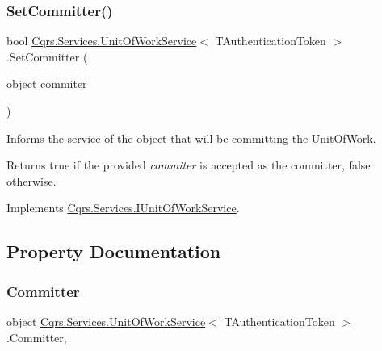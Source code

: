 \subsubsection{\texorpdfstring{Set\+Committer()}{SetCommitter()}}
{\footnotesize\ttfamily bool \hyperlink{classCqrs_1_1Services_1_1UnitOfWorkService}{Cqrs.\+Services.\+Unit\+Of\+Work\+Service}$<$ T\+Authentication\+Token $>$.Set\+Committer (\begin{DoxyParamCaption}\item[{object}]{commiter }\end{DoxyParamCaption})}



Informs the service of the object that will be committing the \hyperlink{classCqrs_1_1Services_1_1UnitOfWorkService_a1ba76512e37e5006c2b65d071803e99f_a1ba76512e37e5006c2b65d071803e99f}{Unit\+Of\+Work}. 

\begin{DoxyReturn}{Returns}
true if the provided {\itshape commiter}  is accepted as the committer, false otherwise. 
\end{DoxyReturn}


Implements \hyperlink{interfaceCqrs_1_1Services_1_1IUnitOfWorkService_a54f241cd90bbebf9cc73d5a296ed593b_a54f241cd90bbebf9cc73d5a296ed593b}{Cqrs.\+Services.\+I\+Unit\+Of\+Work\+Service}.



\subsection{Property Documentation}
\mbox{\label{classCqrs_1_1Services_1_1UnitOfWorkService_aabeccb6ba949fe02b8676b324f85950b_aabeccb6ba949fe02b8676b324f85950b}} 
\subsubsection{\texorpdfstring{Committer}{Committer}}
{\footnotesize\ttfamily object \hyperlink{classCqrs_1_1Services_1_1UnitOfWorkService}{Cqrs.\+Services.\+Unit\+Of\+Work\+Service}$<$ T\+Authentication\+Token $>$.Committer\hspace{0.3cm}{\ttfamily [get]}, {\ttfamily [protected]}}

